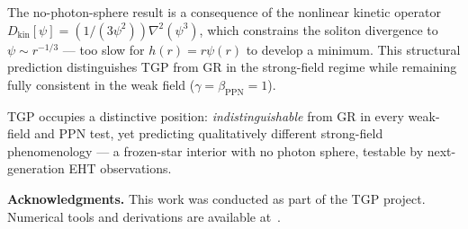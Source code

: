 \documentclass[11pt,a4paper]{article}
\theoremstyle{definition}
\theoremstyle{remark}
\begin{document}
The no-photon-sphere result is a consequence of the nonlinear kinetic
operator $D_{\mathrm{kin}}[\psi] = (1/(3\psi^2))\nabla^2(\psi^3)$,
which constrains the soliton divergence to $\psi \sim r^{-1/3}$
--- too slow for $h(r) = r\psi(r)$ to develop a minimum.  This
structural prediction distinguishes TGP from GR in the strong-field
regime while remaining fully consistent in the weak field
($\gamma = \beta_{\mathrm{PPN}} = 1$).

TGP occupies a distinctive position: \emph{indistinguishable} from
GR in every weak-field and PPN test, yet predicting qualitatively
different strong-field phenomenology --- a frozen-star interior with
no photon sphere, testable by next-generation EHT observations.

\bigskip
\noindent\textbf{Acknowledgments.}\quad
This work was conducted as part of the TGP project.  Numerical tools and
derivations are available at~\cite{TGP-repo}.



\end{document}

